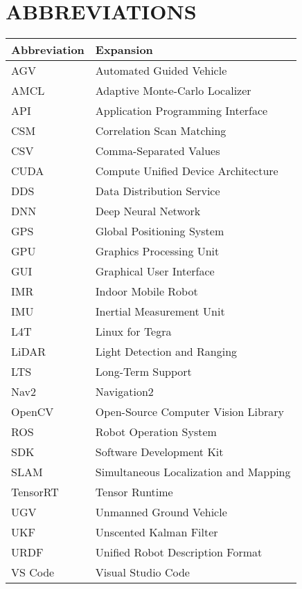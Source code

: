 \newpage

\chapter*{\vspace{-1.5in}ABBREVIATIONS\vspace{-0.1in}}
%

\begin{flushleft}
	\begin{tabular}{p{} p{}}
		\hline
		Abbreviation & Expansion \\
		\hline
		
		AGV			& Automated Guided Vehicle\\
		AMCL		& Adaptive Monte-Carlo Localizer\\
		API			& Application Programming Interface\\
		CSM			& Correlation Scan Matching\\
		CSV			& Comma-Separated Values\\
		CUDA		& Compute Unified Device Architecture\\
		DDS			& Data Distribution Service\\
		DNN			& Deep Neural Network\\
		GPS			& Global Positioning System\\
		GPU			& Graphics Processing Unit\\
		GUI			& Graphical User Interface\\
		IMR			& Indoor Mobile Robot\\
		IMU			& Inertial Measurement Unit\\
		L4T			& Linux for Tegra\\
		LiDAR		& Light Detection and Ranging\\
		LTS			& Long-Term Support\\
		Nav2		& Navigation2\\
		OpenCV		& Open-Source Computer Vision Library\\
		ROS			& Robot Operation System\\
		SDK			& Software Development Kit\\
		SLAM		& Simultaneous Localization and Mapping\\
		TensorRT	& Tensor Runtime\\
		UGV			& Unmanned Ground Vehicle\\
		UKF			& Unscented Kalman Filter\\
		URDF		& Unified Robot Description Format\\
		VS Code		& Visual Studio Code\\
		\hline
	\end{tabular}
\end{flushleft}